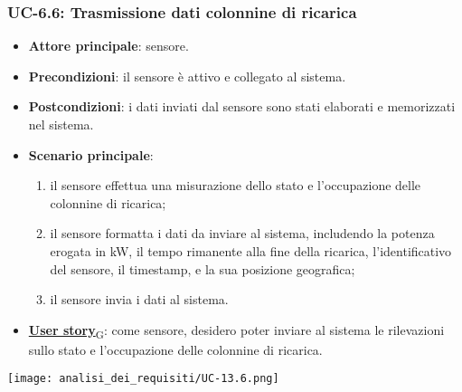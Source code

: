 \subsubsection{UC-6.6: Trasmissione dati colonnine di ricarica}
\begin{itemize}
	\item \textbf{Attore principale}: sensore.
	\item \textbf{Precondizioni}: il sensore è attivo e collegato al sistema.
	\item \textbf{Postcondizioni}: i dati inviati dal sensore sono stati elaborati e memorizzati nel sistema.
	\item \textbf{Scenario principale}:
	      \begin{enumerate}
		      \item il sensore effettua una misurazione dello stato e l'occupazione delle colonnine di ricarica;
		      \item il sensore formatta i dati da inviare al sistema, includendo la potenza erogata in kW, il tempo rimanente alla fine della ricarica, l'identificativo del sensore,
		            il timestamp, e la sua posizione geografica;
		      \item il sensore invia i dati al sistema.
	      \end{enumerate}
	\item \href{https://7last.github.io/docs/pb/documentazione-interna/glossario\#user-story}{\textbf{User story}\textsubscript{G}}:
	      come sensore, desidero poter inviare al sistema le rilevazioni sullo stato e l'occupazione delle colonnine di ricarica.
\end{itemize}
\begin{center}
	\texttt{[image: analisi\_dei\_requisiti/UC-13.6.png]}
\end{center}

